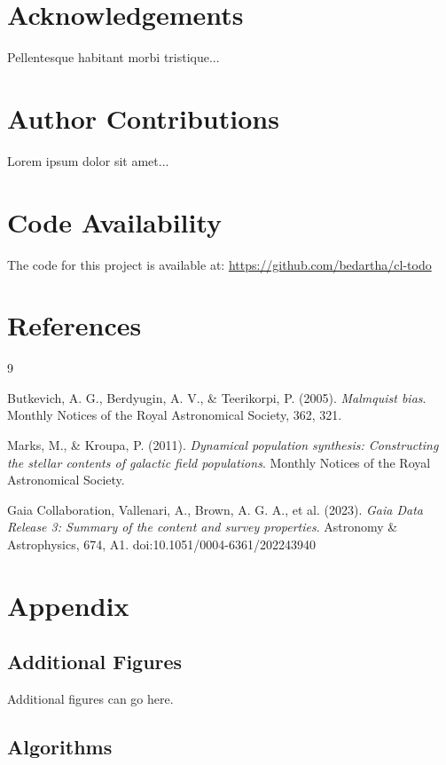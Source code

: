 \documentclass[11pt]{article}
\begin{document}
\section{Acknowledgements}
Pellentesque habitant morbi tristique...

\section{Author Contributions}
Lorem ipsum dolor sit amet...

\section{Code Availability}
The code for this project is available at:
\url{https://github.com/bedartha/cl-todo}

\section{References}
\begin{thebibliography}{9}

Butkevich, A. G., Berdyugin, A. V., \& Teerikorpi, P. (2005).
\textit{Malmquist bias}.
Monthly Notices of the Royal Astronomical Society, 362, 321.

Marks, M., \& Kroupa, P. (2011).
\textit{Dynamical population synthesis: Constructing the stellar contents of galactic field populations}.
Monthly Notices of the Royal Astronomical Society.

Gaia Collaboration, Vallenari, A., Brown, A. G. A., et al. (2023).
\textit{Gaia Data Release 3: Summary of the content and survey properties}.
Astronomy \& Astrophysics, 674, A1.
doi:10.1051/0004-6361/202243940

\end{thebibliography}

\section{Appendix}

\subsection{Additional Figures}
Additional figures can go here.

\subsection{Algorithms}
\end{document}
